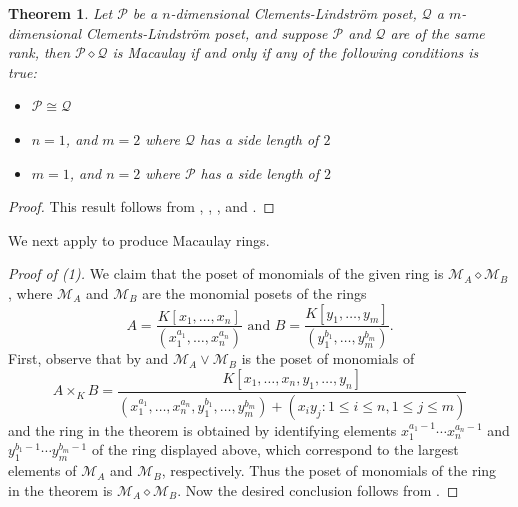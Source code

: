\documentclass[11pt, reqno]{amsart}
\newcommand{\Q}{{\mathcal Q}}
\newcommand{\M}{{\mathcal M}}
\renewcommand{\P}{{\mathcal P}}
\theoremstyle{plain} %
\newtheorem{thm}{Theorem}[section]
\theoremstyle{definition}
\theoremstyle{remark}
\numberwithin{equation}{section}  %
\begin{document}
\begin{thm}\label{thm: classification diamond product of boxes}
Let $\P$ be a $n$-dimensional Clements-Lindstr\"{o}m poset, %
$\Q$ a $m$-dimensional Clements-Lindstr\"{o}m poset, %
and suppose $\P$ and $\Q$ are of the same rank, then $\P \diamond \Q$ is Macaulay if and only if any of the following conditions is true:
\begin{itemize}
\item $\P \cong \Q$
\item $n = 1$, and $m = 2$ where $\Q$ has a side length of $2$
\item $m = 1$, and $n = 2$ where $\P$ has a side length of $2$
\end{itemize}
\end{thm}

\begin{proof}
    This result follows  from , , 
    , and .
\end{proof}


We next apply  to produce Macaulay rings.


\begin{proof}[Proof of  (1)]\label{proofD1}
We claim that the poset of monomials of the given ring is $\M_A\diamond \M_B$, where $\M_A$ and $\M_B$ are the monomial posets of the rings
\[
A=\frac{K[x_1,\ldots, x_n]}{(x_1^{a_1}, \ldots, x_n^{a_n})} \text{ and } B=\frac{K[y_1,\ldots, y_m]}{(y_1^{b_1}, \ldots, y_m^{b_m})}.
\]
First, observe that by  and   $\M_A\vee \M_B$ is the poset of monomials of
\begin{equation*}
A\times_K B=  
    \frac{K[x_1,\ldots, x_n,y_1,\ldots, y_n]}{(x_1^{a_1},\ldots, x_n^{a_n}, y_1^{b_1},\ldots, y_m^{b_m})+( x_iy_j:1\leq i\leq n, 1\leq j\leq m)}
\end{equation*}
and the ring in the theorem is obtained by identifying elements $x_1^{a_1-1}\cdots x_n^{a_n-1}$ and $y_1^{b_1-1}\cdots y_m^{b_m-1}$ of the ring displayed above,  which correspond to the largest elements of $\M_A$ and $\M_B$, respectively. Thus the poset of monomials of the ring in the theorem is $\M_A\diamond \M_B$. Now the desired conclusion follows from .
\end{proof}
\end{document}
